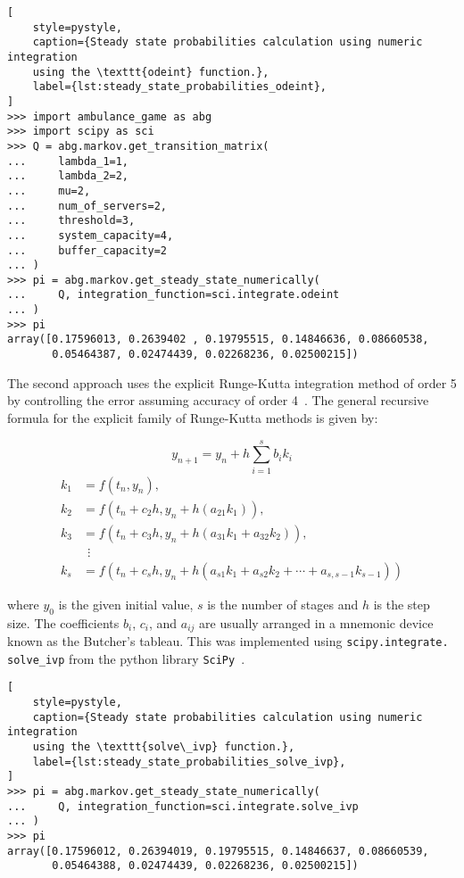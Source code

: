 \begin{lstlisting}[
    style=pystyle,
    caption={Steady state probabilities calculation using numeric integration
    using the \texttt{odeint} function.},
    label={lst:steady_state_probabilities_odeint},
]
>>> import ambulance_game as abg
>>> import scipy as sci
>>> Q = abg.markov.get_transition_matrix(
...     lambda_1=1,
...     lambda_2=2,
...     mu=2,
...     num_of_servers=2,
...     threshold=3,
...     system_capacity=4,
...     buffer_capacity=2
... )
>>> pi = abg.markov.get_steady_state_numerically(
...     Q, integration_function=sci.integrate.odeint
... )
>>> pi
array([0.17596013, 0.2639402 , 0.19795515, 0.14846636, 0.08660538,
       0.05464387, 0.02474439, 0.02268236, 0.02500215])

\end{lstlisting}



The second approach uses the explicit Runge-Kutta integration method of order 5
by controlling the error assuming accuracy of order
4~\cite{solve_ivp_rk45_method, runge_kutta_formulas}.
The general recursive formula for the explicit family of Runge-Kutta methods is
given by:

\begin{equation}
    y_{n+1} = y_n + h \sum_{i=1}^s b_i k_i
\end{equation}
\begin{align}
    k_1 & = f(t_n, y_n), \nonumber \\
    k_2 & = f(t_n+c_2h, y_n+h(a_{21}k_1)), \nonumber \\
    k_3 & = f(t_n+c_3h, y_n+h(a_{31}k_1+a_{32}k_2)), \nonumber \\
        & \ \ \vdots \nonumber \\
    k_s & = f(t_n+c_s h, y_n+h(a_{s1}k_1+a_{s2}k_2+\cdots+a_{s,s-1}k_{s-1}))
    \nonumber
\end{align}

where \(y_0\) is the given initial value, \(s\) is the number of stages and
\(h\) is the step size.
The coefficients \(b_i\), \(c_i\), and \(a_{ij}\) are usually arranged in a
mnemonic device known as the Butcher's tableau.
This was implemented using \texttt{scipy.integrate. solve\_ivp} from the python
library \texttt{SciPy}~\cite{2020SciPy-NMeth}.

\begin{lstlisting}[
    style=pystyle,
    caption={Steady state probabilities calculation using numeric integration
    using the \texttt{solve\_ivp} function.},
    label={lst:steady_state_probabilities_solve_ivp},
]
>>> pi = abg.markov.get_steady_state_numerically(
...     Q, integration_function=sci.integrate.solve_ivp
... )
>>> pi
array([0.17596012, 0.26394019, 0.19795515, 0.14846637, 0.08660539,
       0.05464388, 0.02474439, 0.02268236, 0.02500215])

\end{lstlisting}


